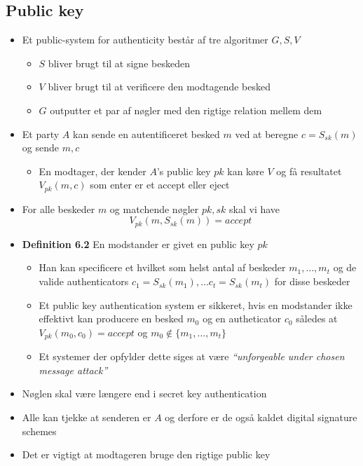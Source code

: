 \documentclass[a4, english]{article}
\begin{document}
\subsection{Public key}
\begin{itemize}
	\item Et public-system for authenticity består af tre algoritmer $G, S, V$
  \begin{itemize}
  	\item $S$ bliver brugt til at signe beskeden
    \item $V$ bliver brugt til at verificere den modtagende besked
    \item $G$ outputter et par af nøgler med den rigtige relation mellem dem 
  \end{itemize}
  \item Et party $A$ kan sende en autentificeret besked $m$ ved at beregne $c=S_{sk}(m)$ og sende $m,c$ 
  \begin{itemize}
  	\item En modtager, der kender $A$'s public key $pk$ kan køre $V$ og få resultatet $V_{pk}(m,c)$ som enter er et accept eller eject 
  \end{itemize}
  \item For alle beskeder $m$ og matchende nøgler $pk, sk$ skal vi have
\begin{equation*}
  V_{pk}(m,S_{sk}(m))=accept
\end{equation*}
  \item \textbf{Definition 6.2} En modstander er givet en public key $pk$ 
  \begin{itemize}
  	\item Han kan specificere et hvilket som helst antal af beskeder $m_1, \dots, m_t$ og de valide authenticators  $c_1=S_{sk}(m_1), \dots c_t=S_{sk}(m_t)$ for disse beskeder
    \item Et public key authentication system er sikkeret, hvis en modstander ikke effektivt kan producere en besked $m_0$ og en autheticator $c_0$ således at $V_{pk}(m_0,c_0)=accept$ og $m_0 \notin \{m_1, \dots, m_t\}$
    \item Et systemer der opfylder dette siges at være \textit{``unforgeable under chosen message attack''}
  \end{itemize}
  \item Nøglen skal være længere end i secret key authentication
  \item Alle kan tjekke at senderen er $A$ og derfore er de også kaldet digital signature schemes
  \item Det er vigtigt at modtageren bruge den rigtige public key
\end{itemize}
\end{document}
